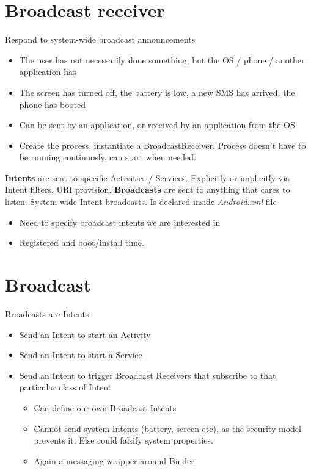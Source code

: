 \documentclass{article}
\begin{document}
\tableofcontents

\newpage

\section{Broadcast receiver}

\begin{flushleft}
Respond to system-wide broadcast announcements
\begin{itemize}
  \item The user has not necessarily done something, but the OS / phone / another application has 
  \item The screen has turned off, the battery is low, a new SMS has arrived, the phone has booted 
  \item Can be sent by an application, or received by an application from the OS 
  \item Create the process, instantiate a BroadcastReceiver. Process doesn't have to be running continuosly, can start when needed.
\end{itemize}
\textbf{Intents} are sent to specific Activities / Services. Explicitly or implicitly via Intent filters, URI provision. \textbf{Broadcasts} are sent to anything that cares to listen. System-wide Intent broadcasts. Is declared inside \textit{Android.xml} file
  \begin{itemize}
    \item Need to specify broadcast intents we are interested in
    \item Registered and boot/install time.
  \end{itemize}
\end{flushleft}

\section{Broadcast}

\begin{flushleft}
Broadcasts are Intents
\begin{itemize}
  \item  Send an Intent to start an Activity 
  \item Send an Intent to start a Service 
  \item Send an Intent to trigger Broadcast Receivers that subscribe to that particular class of Intent 
  \begin{itemize}
    \item Can define our own Broadcast Intents 
    \item Cannot send system Intents (battery, screen etc), as the security model prevents it. Else could falsify system properties. 
    \item Again a messaging wrapper around Binder
  \end{itemize}
\end{itemize}
\end{flushleft}
\end{document}
